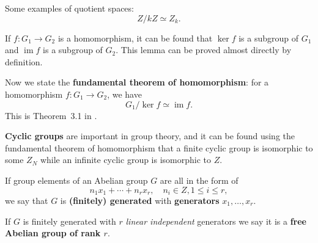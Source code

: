 \documentclass[hyperref, a4paper]{article}
\DeclareMathOperator{\im}{im}
\newcommand*{\concept}[1]{{\textbf{#1}}}
\def\mathbb#1{#1}%
\begin{document}
Some examples of quotient spaces:
\begin{equation}
    \mathbb{Z} / k \mathbb{Z} \simeq \mathbb{Z}_k.
\end{equation}

If $f: G_1 \to G_2$ is a homomorphism, it can be found that $\ker f$ is a subgroup of $G_1$ and $\im f$ is a subgroup 
of $G_2$. This lemma can be proved almost directly by definition.

Now we state the \concept{fundamental theorem of homomorphism}: for a homomorphism $f: G_1 \to G_2$, we have 
\begin{equation}
    G_1 / \ker f \simeq \im f.
\end{equation}
This is Theorem~3.1 in \cite{nakahara}. 

\concept{Cyclic groups} are important in group theory, and it can be found using the fundamental theorem 
of homomorphism that a finite cyclic group is isomorphic to some $\mathbb{Z}_N$ while an infinite cyclic 
group is isomorphic to $\mathbb{Z}$. 

If group elements of an Abelian group $G$ are all in the form of 
\begin{equation}
    n_{1} x_{1}+\cdots+n_{r} x_{r}, \quad n_{i} \in \mathbb{Z}, 1 \leq i \leq r,
\end{equation}
we say that $G$ is \concept{(finitely) generated} with \concept{generators} $x_1, \ldots, x_r$.

If $G$ is finitely generated with $r$ \emph{linear independent} generators we say it is a 
\concept{free Abelian group of rank $r$}. 



 
\end{document}
